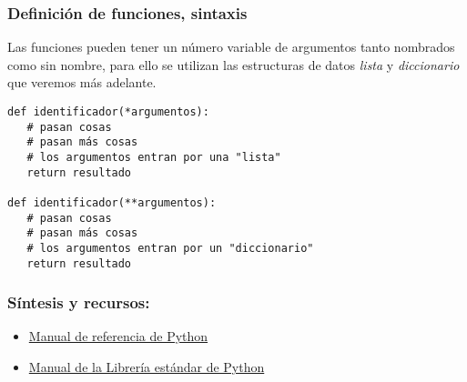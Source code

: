 \documentclass{beamer}
\begin{document}
\begin{frame}[fragile]
\frametitle{Definición de funciones, sintaxis}
Las funciones pueden tener un número variable de argumentos tanto nombrados como sin nombre, para ello se utilizan las estructuras de datos {\em lista} y {\em diccionario} que veremos más adelante.
\begin{block}{}
\begin{verbatim}
def identificador(*argumentos):
   # pasan cosas
   # pasan más cosas
   # los argumentos entran por una "lista"
   return resultado 
 
def identificador(**argumentos):
   # pasan cosas
   # pasan más cosas
   # los argumentos entran por un "diccionario"
   return resultado   
\end{verbatim}
\end{block}
\end{frame}

\begin{frame}
\frametitle{Síntesis y recursos:}

\begin{itemize}
\item \href{https://docs.python.org/3/reference/index.html}{Manual de referencia de Python}
\item \href{https://docs.python.org/3/library/index.html}{Manual de la Librería estándar de Python}
\end{itemize}
\end{frame}
\end{document}
